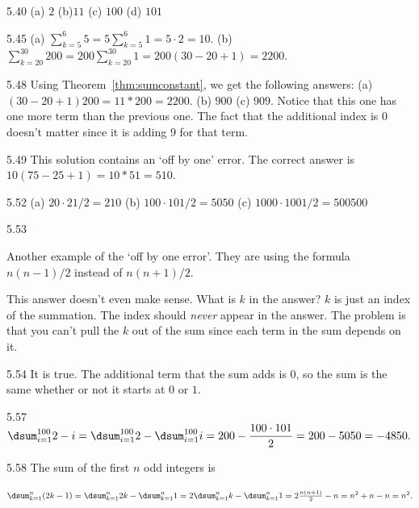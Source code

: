 \begin{Answer}{5.40}
(a) $2$
(b)$11$
(c) $100$
(d) $101$
\end{Answer}
\begin{Answer}{5.45}
(a) ${\displaystyle \sum_{k=5}^{6} 5 = 5 \sum_{k=5}^{6} 1= 5\cdot 2 = 10 }$.
(b) ${\displaystyle \sum_{k=20}^{30} 200 = 200\sum_{k=20}^{30} 1=200(30-20+1)=2200}$.
\end{Answer}
\begin{Answer}{5.48}
Using Theorem~\ref{thm:sumconstant}, we get the following answers:
(a) $(30-20+1)200=11*200=2200$.
(b) $900$
(c) $909$. Notice that this one has one more term than the previous one.
The fact that the additional index is $0$ doesn't matter since it is adding $9$ for that term.
\end{Answer}
\begin{Answer}{5.49}
This solution contains an `off by one' error.  The correct answer is $10(75-25+1)=10*51=510$.
\end{Answer}
\begin{Answer}{5.52}
(a) $20\cdot 21/2=210$
(b) $100\cdot 101/2=5050$
(c) $1000\cdot 1001/2=500500$
\end{Answer}
\begin{Answer}{5.53}
\begin{solevalenum}
\item
Another example of the `off by one error'.  They are using the formula $n(n-1)/2$
instead of $n(n+1)/2$.
\item
This answer doesn't even make sense.  What is $k$ in the answer?  $k$ is just an
index of the summation.  The index should {\em never} appear in the answer.
The problem is that you can't pull the $k$ out of the sum since each term in the
sum depends on it.
\end{solevalenum}
\end{Answer}
\begin{Answer}{5.54}
It is true.  The additional term that the sum adds is $0$, so the sum is the same whether
or not it starts at $0$ or $1$.
\end{Answer}
\begin{Answer}{5.57}
$\dsum_{i=1}^{100} 2 - i =\dsum_{i=1}^{100} 2 - \dsum_{i=1}^{100} i
=200 - \dfrac{100\cdot 101}{2} = 200-5050 = -4850.$
\end{Answer}
\begin{Answer}{5.58}
The sum of the first $n$ odd integers is

\noindent
$\dsum_{k=1}^{n}(2k-1)=
\dsum_{k=1}^{n}2k-\dsum_{k=1}^{n}1=
2\dsum_{k=1}^{n}k-\dsum_{k=1}^{n}1=
2\frac{n(n+1)}{2}-n=n^2+n-n=n^2.
$
\end{Answer}

